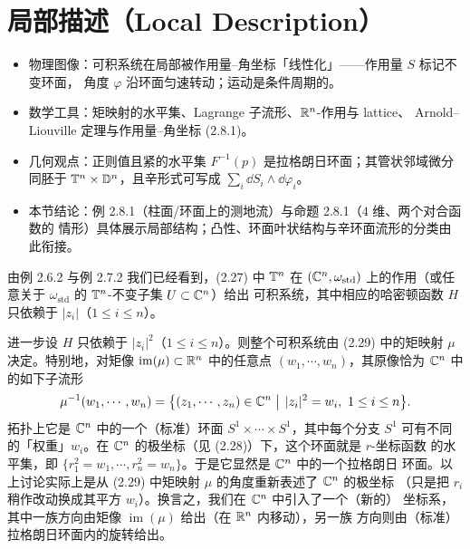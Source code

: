 \section{局部描述（Local Description）}

\begin{keytakeaways}
\begin{itemize}
  \item 物理图像：可积系统在局部被作用量–角坐标「线性化」——作用量 $S$ 标记不变环面，
        角度 $\varphi$ 沿环面匀速转动；运动是条件周期的。
  \item 数学工具：矩映射的水平集、Lagrange 子流形、$\mathbb{R}^n$-作用与 lattice、
        Arnold--Liouville 定理与作用量–角坐标 (2.8.1)。
  \item 几何观点：正则值且紧的水平集 $F^{-1}(p)$ 是拉格朗日环面；其管状邻域微分同胚于
        $\mathbb{T}^n\times\mathbb{D}^n$，且辛形式可写成 $\sum_i\dd S_i\wedge\dd\varphi_i$。
  \item 本节结论：例 2.8.1（柱面/环面上的测地流）与命题 2.8.1（$4$ 维、两个对合函数的
        情形）具体展示局部结构；凸性、环面叶状结构与辛环面流形的分类由此衔接。
\end{itemize}
\end{keytakeaways}

由例 2.6.2 与例 2.7.2 我们已经看到，(2.27) 中 $\mathbb{T}^n$ 在 $(\mathbb{C}^n,\omega_{\mathrm{std}})$
上的作用（或任意关于 $\omega_{\mathrm{std}}$ 的 $\mathbb{T}^n$-不变子集 $U\subset\mathbb{C}^n$）给出
可积系统，其中相应的哈密顿函数 $H$ 只依赖于 $|z_i|$（$1\le i\le n$）。

进一步设 $H$ 只依赖于 $|z_i|^2$（$1\le i\le n$）。则整个可积系统由 (2.29) 中的矩映射
$\mu$ 决定。特别地，对矩像 $\operatorname{im}(\mu)\subset\mathbb{R}^n$ 中的任意点
$(w_1,\cdots,w_n)$，其原像恰为 $\mathbb{C}^n$ 中的如下子流形
\[
  \mu^{-1}(w_1,\cdots,w_n)
  =\big\{(z_1,\cdots,z_n)\in\mathbb{C}^n\bigm|\,|z_i|^2=w_i,\ 1\le i\le n\big\}.
\]
拓扑上它是 $\mathbb{C}^n$ 中的一个（标准）环面 $S^1\times\cdots\times S^1$，其中每个分支 $S^1$
可有不同的「权重」$w_i$。在 $\mathbb{C}^n$ 的极坐标（见 (2.28)）下，这个环面就是 $r$-坐标函数
的水平集，即 $\{r_1^2=w_1,\cdots,r_n^2=w_n\}$。于是它显然是 $\mathbb{C}^n$ 中的一个拉格朗日
环面。以上讨论实际上是从 (2.29) 中矩映射 $\mu$ 的角度重新表述了 $\mathbb{C}^n$ 的极坐标
（只是把 $r_i$ 稍作改动换成其平方 $w_i$）。换言之，我们在 $\mathbb{C}^n$ 中引入了一个（新的）
坐标系，其中一族方向由矩像 $\operatorname{im}(\mu)$ 给出（在 $\mathbb{R}^n$ 内移动），另一族
方向则由（标准）拉格朗日环面内的旋转给出。

